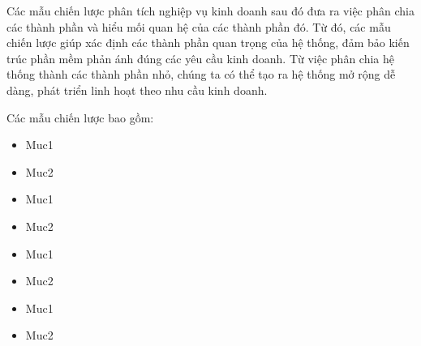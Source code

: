 Các mẫu chiến lược phân tích nghiệp vụ kinh doanh sau đó đưa ra việc phân chia các thành phần và hiểu mối quan hệ của các thành phần đó. Từ đó, các mẫu chiến lược giúp xác định các thành phần quan trọng của hệ thống, đảm bảo kiến trúc phần mềm phản ánh đúng các yêu cầu kinh doanh. Từ việc phân chia hệ thống thành các thành phần nhỏ, chúng ta có thể tạo ra hệ thống mở rộng dễ dàng, phát triển linh hoạt theo nhu cầu kinh doanh.

Các mẫu chiến lược bao gồm:

\begin{itemize}







    \item Muc1

    \item Muc2

    \item Muc1

    \item Muc2

    \item Muc1

    \item Muc2

    \item Muc1

    \item Muc2

\end{itemize}






